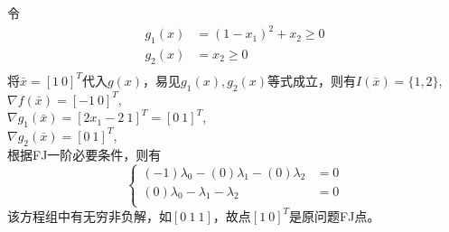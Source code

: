 \begin{solution}
         令
    \begin{align*}
        g_1(x)&=(1 - x_1)^2 + x_2\geq 0\\
        g_2(x)&=x_2\geq0\\
    \end{align*}
    将$\bar{x}=[1\ 0]^T$代入$g(x)$，易见$g_1(x),g_2(x)$等式成立，则有$I(\bar{x})=\{1,2\}$,\\
    $\nabla f(\bar{x})=[-1\ 0]^T$,\\
    $\nabla g_1(\bar{x})=[2x_1-2\ 1]^T=[0\ 1]^T$,\\
    $\nabla g_2(\bar{x})=[0\ 1]^T$,\\
    根据FJ一阶必要条件，则有
    $$\left\{
    \begin{aligned}
        (-1)\lambda_0 - (0)\lambda_1 - (0)\lambda_2 &=0\\
        (0)\lambda_0 - \lambda_1 - \lambda_2 &=0\\
    \end{aligned}\right.$$
    该方程组中有无穷非负解，如$[0\ 1\ 1]$，故点$[1\ 0]^T$是原问题FJ点。
\end{solution}